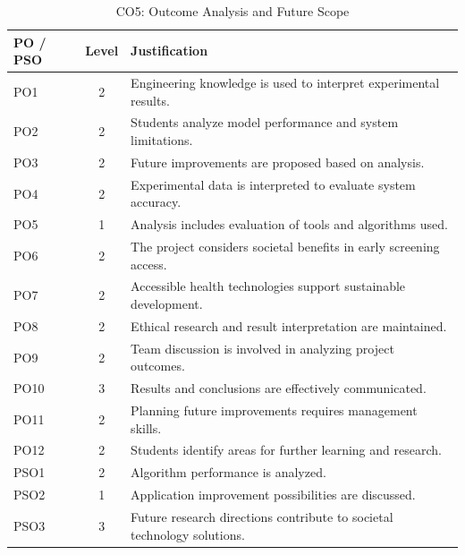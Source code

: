 \documentclass[12pt,a4paper]{report}
\begin{document}
\begin{table}[h!]
    \centering
    \caption{CO5: Outcome Analysis and Future Scope}
    \renewcommand{\arraystretch}{1.3}
    \begin{tabularx}{\textwidth}{@{}l c X@{}}
        \toprule
        \textbf{PO / PSO} & \textbf{Level} & \textbf{Justification} \\
        \midrule
        PO1 & 2 & Engineering knowledge is used to interpret experimental results. \\
        PO2 & 2 & Students analyze model performance and system limitations. \\
        PO3 & 2 & Future improvements are proposed based on analysis. \\
        PO4 & 2 & Experimental data is interpreted to evaluate system accuracy. \\
        PO5 & 1 & Analysis includes evaluation of tools and algorithms used. \\
        PO6 & 2 & The project considers societal benefits in early screening access. \\
        PO7 & 2 & Accessible health technologies support sustainable development. \\
        PO8 & 2 & Ethical research and result interpretation are maintained. \\
        PO9 & 2 & Team discussion is involved in analyzing project outcomes. \\
        PO10 & 3 & Results and conclusions are effectively communicated. \\
        PO11 & 2 & Planning future improvements requires management skills. \\
        PO12 & 2 & Students identify areas for further learning and research. \\
        PSO1 & 2 & Algorithm performance is analyzed. \\
        PSO2 & 1 & Application improvement possibilities are discussed. \\
        PSO3 & 3 & Future research directions contribute to societal technology solutions. \\
        \bottomrule
    \end{tabularx}
\end{table}
\end{document}
